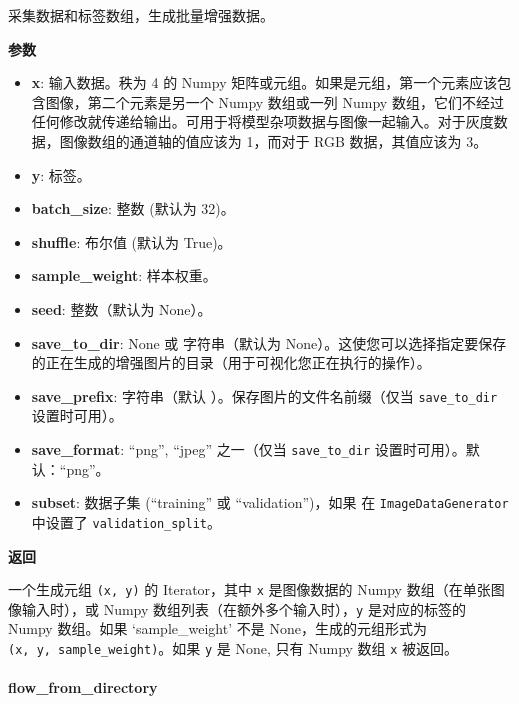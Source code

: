 采集数据和标签数组，生成批量增强数据。

\textbf{参数}

\begin{itemize}
\tightlist
\item
  \textbf{x}: 输入数据。秩为 4 的 Numpy
  矩阵或元组。如果是元组，第一个元素应该包含图像，第二个元素是另一个
  Numpy 数组或一列 Numpy
  数组，它们不经过任何修改就传递给输出。可用于将模型杂项数据与图像一起输入。对于灰度数据，图像数组的通道轴的值应该为
  1，而对于 RGB 数据，其值应该为 3。
\item
  \textbf{y}: 标签。
\item
  \textbf{batch\_size}: 整数 (默认为 32)。
\item
  \textbf{shuffle}: 布尔值 (默认为 True)。
\item
  \textbf{sample\_weight}: 样本权重。
\item
  \textbf{seed}: 整数（默认为 None）。
\item
  \textbf{save\_to\_dir}: None 或 字符串（默认为
  None）。这使您可以选择指定要保存的正在生成的增强图片的目录（用于可视化您正在执行的操作）。
\item
  \textbf{save\_prefix}: 字符串（默认
  \texttt{\textquotesingle{}\textquotesingle{}}）。保存图片的文件名前缀（仅当
  \texttt{save\_to\_dir} 设置时可用）。
\item
  \textbf{save\_format}: ``png'', ``jpeg'' 之一（仅当
  \texttt{save\_to\_dir} 设置时可用）。默认：``png''。
\item
  \textbf{subset}: 数据子集 (``training'' 或 ``validation'')，如果 在
  \texttt{ImageDataGenerator} 中设置了 \texttt{validation\_split}。
\end{itemize}

\textbf{返回}

一个生成元组 \texttt{(x,\ y)} 的 Iterator，其中 \texttt{x} 是图像数据的
Numpy 数组（在单张图像输入时），或 Numpy
数组列表（在额外多个输入时），\texttt{y} 是对应的标签的 Numpy 数组。如果
`sample\_weight' 不是 None，生成的元组形式为
\texttt{(x,\ y,\ sample\_weight)}。如果 \texttt{y} 是 None, 只有 Numpy
数组 \texttt{x} 被返回。


\hypertarget{flow_from_directory}{%
\paragraph{flow\_from\_directory}\label{flow_from_directory}}

